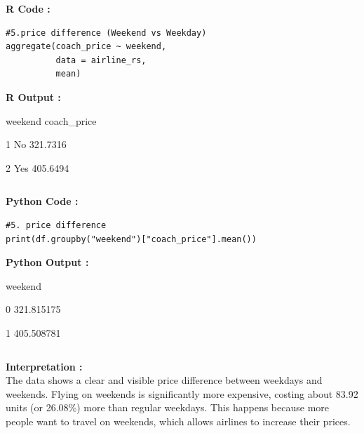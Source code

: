 \documentclass[11pt,a4paper]{article}
\begin{document}
\noindent \textbf{R Code :}
\begin{codebox}
\begin{lstlisting}[style=Rstyle]
#5.price difference (Weekend vs Weekday)
aggregate(coach_price ~ weekend,
          data = airline_rs,
          mean)

\end{lstlisting}
\end{codebox}

\vspace{0.5em}
\noindent \textbf{R Output :}

weekend coach\_price

1      No    321.7316


2     Yes    405.6494

\begin{verbatim}
\end{verbatim}
\vspace{0.5em}
\noindent \textbf{Python Code :}
\begin{codebox}
\begin{lstlisting}[style=Pythonstyle]
#5. price difference
print(df.groupby("weekend")["coach_price"].mean())
\end{lstlisting}
\end{codebox}
\vspace{0.5em}
\noindent \textbf{Python Output :}

weekend

0    321.815175

1    405.508781
\begin{verbatim}
\end{verbatim}
\vspace{0.5em}
\noindent \textbf{Interpretation :} \\
The data shows a clear and visible price difference between weekdays and weekends. Flying on weekends is significantly more expensive, costing about 83.92 units (or 26.08\%) more than regular weekdays. This happens because more people want to travel on weekends, which allows airlines to increase their prices.
\vspace{2.5em}
\end{document}
